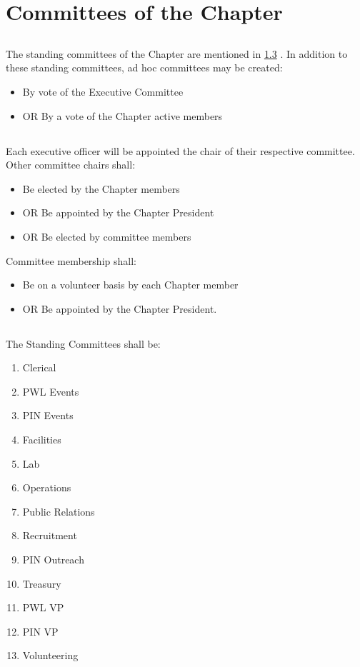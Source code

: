 \documentclass[10pt, oneside]{article}
\begin{document}
\section{Committees of the Chapter}
\subsection{}
The standing committees of the Chapter are mentioned in \ref{committees} . In addition to these standing committees, ad hoc committees may be created:
\begin{itemize}
    \item By vote of the Executive Committee
    \item OR By a vote of the Chapter active members
\end{itemize}


\subsection{}
Each executive officer will be appointed the chair of their respective committee. Other committee chairs shall:
\begin{itemize}
    \item Be elected by the Chapter members
    \item OR Be appointed by the Chapter President
    \item OR Be elected by committee members
\end{itemize}

Committee membership shall:
\begin{itemize}
    \item Be on a volunteer basis by each Chapter member
    \item OR Be appointed by the Chapter President.
\end{itemize}

\subsection{ } \label{committees}
The Standing Committees shall be:
\begin{enumerate}[label=\alph*.]
    \item Clerical
    \item PWL Events
	\item PIN Events
    \item Facilities
    \item Lab
    \item Operations
    \item Public Relations
    \item Recruitment
	\item PIN Outreach
    \item Treasury
    \item PWL VP
	\item PIN VP
    \item Volunteering
\end{enumerate}
\end{document}
